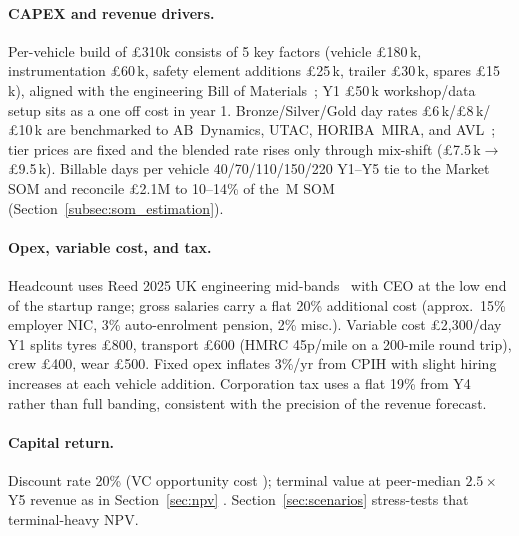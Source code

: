 \documentclass[11pt, a4paper]{report}
\numberwithin{equation}{section}
\newcommand{\yFiveRevenue}{\pounds2.1M\xspace}
\newcommand{\capexPerVehicle}{\pounds310k\xspace}
\begin{document}
\begin{refsection}
\paragraph{CAPEX and revenue drivers.} Per-vehicle build of
\capexPerVehicle{} consists of 5 key factors (vehicle \pounds180\,k,
instrumentation \pounds60\,k, safety element additions \pounds25\,k, trailer
\pounds30\,k, spares \pounds15\,k), aligned with the engineering
Bill of Materials~\cite{mcconnell_engineering,xing_engineering,jiang_engineering,vogelberg_engineering}; Y1
\pounds50\,k workshop/data setup sits as a one off cost in year 1. Bronze/Silver/Gold day rates
\pounds6\,k/\pounds8\,k/\pounds10\,k are benchmarked to
AB~Dynamics, UTAC, HORIBA~MIRA, and AVL~\cite{abdynamics_ar2024,utac_facilities,horiba_brake,avl_profile};
tier prices are fixed and the blended rate rises only through
mix-shift (\pounds7.5\,k$\to$\pounds9.5\,k). Billable days per
vehicle 40/70/110/150/220 Y1--Y5 tie to the Market SOM
\cite{mcconnell_business} and reconcile \yFiveRevenue{} to
10--14\% of the \,M SOM (Section~\ref{subsec:som_estimation}).

\paragraph{Opex, variable cost, and tax.} Headcount uses Reed 2025
UK engineering mid-bands~\cite{reed_salaries_2025} with CEO at the
low end of the startup range; gross salaries carry a flat 20\%
additional cost (approx.\ 15\% employer NIC, 3\% auto-enrolment pension,
2\% misc.). Variable cost \pounds2{,}300/day Y1 splits tyres
\pounds800, transport \pounds600 (HMRC 45p/mile on a 200-mile
round trip), crew \pounds400, wear
\pounds500. Fixed opex inflates 3\%/yr from CPIH
\cite{ons_cpi_2025} with slight hiring increases at each vehicle addition. Corporation
tax uses a flat 19\% from Y4~\cite{hmrc_corp_tax} rather than full
banding, consistent with the precision of the revenue forecast.

\paragraph{Capital return.} Discount rate 20\% (VC opportunity cost
\cite{brealey2020}); terminal value at peer-median $2.5\times$ Y5
revenue as in Section~\ref{sec:npv}
\cite{abdynamics_ar2024,damodaran2012,avl_profile}.
Section~\ref{sec:scenarios} stress-tests that terminal-heavy NPV.


\end{refsection}
\end{document}
